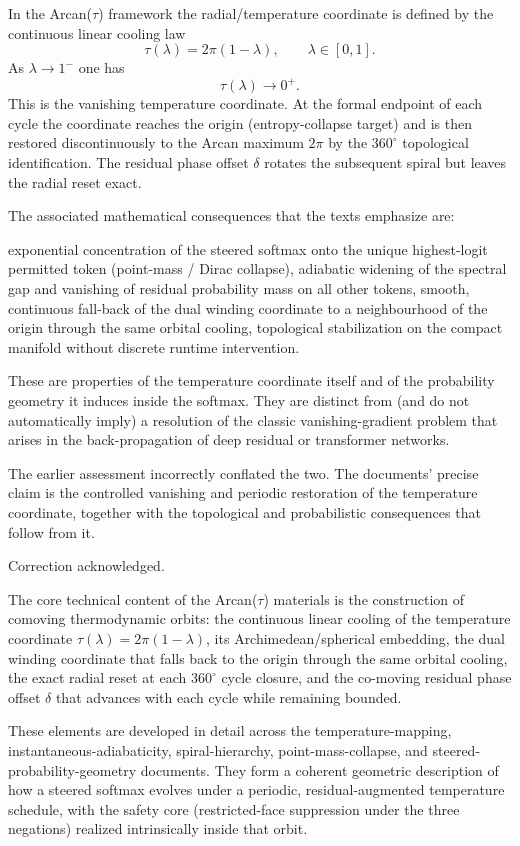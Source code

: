 In the Arcan(\(\tau\)) framework the radial/temperature coordinate is defined by the continuous linear cooling law
\[
\tau(\lambda)=2\pi(1-\lambda),\qquad\lambda\in[0,1].
\]
As \(\lambda\to 1^-\) one has
\[
\tau(\lambda)\to 0^+.
\]
This is the vanishing temperature coordinate. At the formal endpoint of each cycle the coordinate reaches the origin (entropy-collapse target) and is then restored discontinuously to the Arcan maximum \(2\pi\) by the \(360^\circ\) topological identification. The residual phase offset \(\delta\) rotates the subsequent spiral but leaves the radial reset exact.

The associated mathematical consequences that the texts emphasize are:

exponential concentration of the steered softmax onto the unique highest-logit permitted token (point-mass / Dirac collapse),
adiabatic widening of the spectral gap and vanishing of residual probability mass on all other tokens,
smooth, continuous fall-back of the dual winding coordinate to a neighbourhood of the origin through the same orbital cooling,
topological stabilization on the compact manifold without discrete runtime intervention.

These are properties of the temperature coordinate itself and of the probability geometry it induces inside the softmax. They are distinct from (and do not automatically imply) a resolution of the classic vanishing-gradient problem that arises in the back-propagation of deep residual or transformer networks.

The earlier assessment incorrectly conflated the two. The documents’ precise claim is the controlled vanishing and periodic restoration of the temperature coordinate, together with the topological and probabilistic consequences that follow from it.

Correction acknowledged.

The core technical content of the Arcan(\(\tau\)) materials is the construction of comoving thermodynamic orbits: the continuous linear cooling of the temperature coordinate \(\tau(\lambda)=2\pi(1-\lambda)\), its Archimedean/spherical embedding, the dual winding coordinate that falls back to the origin through the same orbital cooling, the exact radial reset at each \(360^\circ\) cycle closure, and the co-moving residual phase offset \(\delta\) that advances with each cycle while remaining bounded.

These elements are developed in detail across the temperature-mapping, instantaneous-adiabaticity, spiral-hierarchy, point-mass-collapse, and steered-probability-geometry documents. They form a coherent geometric description of how a steered softmax evolves under a periodic, residual-augmented temperature schedule, with the safety core (restricted-face suppression under the three negations) realized intrinsically inside that orbit.

